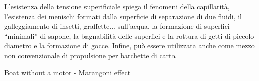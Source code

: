 
\vspace{0.3cm}
\noindent
L'esistenza della tensione superificiale spiega il fenomeni della capillarità, l'esistenza dei menischi formati dalla superficie di separazione di due fluidi, il galleggiamento di insetti, graffette... sull'acqua, la formazione di superfici ``minimali'' di sapone, la bagnabilità delle superfici e la rottura di getti di piccolo diametro e la formazione di gocce. Infine, può essere utilizzata anche come mezzo non convenzionale di propulsione per barchette di carta

\vspace{0.3cm}
\noindent
\href{https://www.youtube.com/watch?v=Oz54Auev9eU}{Boat without a motor - Marangoni effect}
